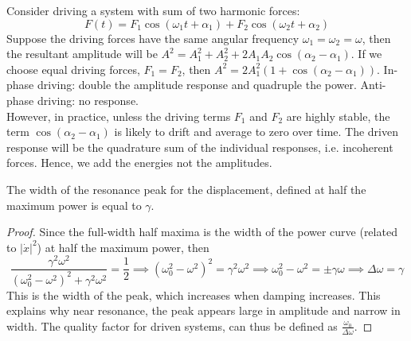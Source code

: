 \documentclass[a4paper]{article}
\begin{document}
\begin{Note}
Consider driving a system with sum of two harmonic forces: 
$$F(t)=F_1\cos(\omega_1t+\alpha_1)+F_2\cos(\omega_2t+\alpha_2)$$
Suppose the driving forces have the same angular frequency $\omega_1=\omega_2=\omega$, then the resultant amplitude will be $A^2=A_1^2+A_2^2+2A_1A_2\cos(\alpha_2-\alpha_1)$. If we choose equal driving forces, $F_1=F_2$, then $A^2=2A_1^2(1+\cos(\alpha_2-\alpha_1))$. In-phase driving: double the amplitude response and quadruple the power. Anti-phase driving: no response.\\[5pt]
However, in practice, unless the driving terms $F_1$ and $F_2$ are highly stable, the term $\cos(\alpha_2-\alpha_1)$ is likely to drift and average to zero over time. The driven response will be the quadrature sum of the individual responses, i.e. incoherent forces. Hence, we add the energies not the amplitudes.
\end{Note}
\begin{thm}
The width of the resonance peak for the displacement, defined at half the maximum power is equal to $\gamma$.
\end{thm}
\begin{proof}
Since the full-width half maxima is the width of the power curve (related to $|\dot{x}|^2$) at half the maximum power, then
$$\frac{\gamma^2\omega^2}{(\omega_0^2-\omega^2)^2+\gamma^2\omega^2}=\frac{1}{2}\implies(\omega_0^2-\omega^2)^2=\gamma^2\omega^2\implies\omega_0^2-\omega^2=\pm\gamma\omega\implies\Delta\omega=\gamma$$
This is the width of the peak, which increases when damping increases. This explains why near resonance, the peak appears large in amplitude and narrow in width. The quality factor for driven systems, can thus be defined as $\frac{\omega_0}{\Delta\omega}$.
\end{proof}
\begin{center}
\end{center}
\end{document}
